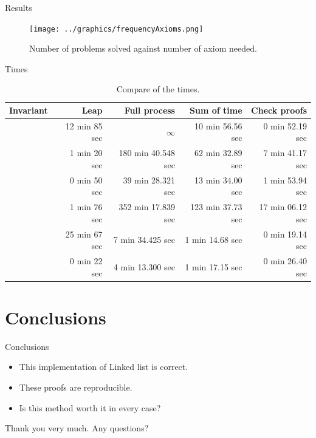 \documentclass[10pt,notes,compress,usetitleprogressbar,aspectratio=1610]{beamer}
\begin{document}
\begin{frame}{Results}

	\begin{figure}[hbtp]
		\centering
		\texttt{[image: ../graphics/frequencyAxioms.png]}
		\caption{Number of problems solved against number of axiom needed.}
		\label{fig:frequencyAxioms}
	\end{figure}

\end{frame}

\begin{frame}{Times}
\begin{table}[hbtp]
\centering
\begin{tabular}{r|rrrr}
Invariant 		& Leap 	& Full process 		& Sum of \spass time 	& Check proofs 	\\\hline
\invPreserve 	& 12 min 85	sec & $\infty$			& 10 min 56.56 sec				& 0 min 52.19 sec		\\
\invOrder		& 1 min 20	sec & 180 min 40.548 sec		& 62 min 32.89 sec				& 7 min 41.17 sec 		\\
\invLock		& 0 min 50	sec & 39 min 28.321 sec			& 13 min 34.00 sec 				& 1 min 53.94 sec		\\
\invNext 		& 1 min 76	sec & 352 min 17.839 sec		& 123 min 37.73 sec				& 17 min 06.12 sec		\\
\invRegion		& 25 min 67	sec & 7 min 34.425 sec			& 1 min 14.68 sec				& 0 min 19.14 sec		\\
\invDisjoint 	& 0 min 22 	sec & 4 min 13.300 sec 			& 1 min 17.15 sec 				& 0 min 26.40 sec		\\
\end{tabular}
\caption{Compare of the times.}
\label{analysis::bigtimetable}
\end{table}
\end{frame}



\section{Conclusions}
\begin{frame}{Conclusions}
\begin{center}
\large
	\begin{itemize}
		\item<1-> This implementation of Linked list is correct.
		\item<2-> These proofs are reproducible.
		\item<3-> Is this method worth it in every case?
	\end{itemize}
\end{center}
\end{frame}



\begin{frame}[standout]

\begin{center}
Thank you very much. Any questions?
\end{center}

\end{frame}
\end{document}
